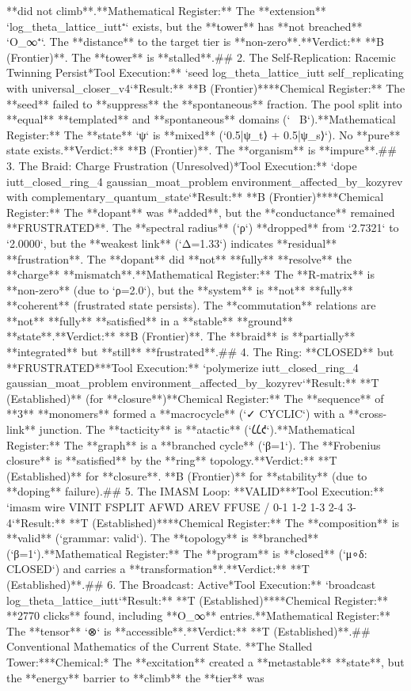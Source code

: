 **did not climb**.\n*   **Mathematical Register:** The **extension** `log_theta_lattice_iutt⁺` exists, but the **tower** has **not breached** `O_∞⁺`. The **distance** to the target tier is **non-zero**.\n*   **Verdict:** **B (Frontier)**. The **tower** is **stalled**.\n\n## 2. The Self-Replication: Racemic Twinning Persist\n**Tool Execution:** `seed log_theta_lattice_iutt self_replicating with universal_closer_v4`\n**Result:** **B (Frontier)**\n*   **Chemical Register:** The **seed** failed to **suppress** the **spontaneous** fraction. The pool split into **equal** **templated** and **spontaneous** domains (`~ B`).\n*   **Mathematical Register:** The **state** `ψ` is **mixed** (`0.5|ψ_t⟩ + 0.5|ψ_s⟩`). No **pure** state exists.\n*   **Verdict:** **B (Frontier)**. The **organism** is **impure**.\n\n## 3. The Braid: Charge Frustration (Unresolved)\n**Tool Execution:** `dope iutt_closed_ring_4 gaussian_moat_problem environment_affected_by_kozyrev with complementary_quantum_state`\n**Result:** **B (Frontier)**\n*   **Chemical Register:** The **dopant** was **added**, but the **conductance** remained **FRUSTRATED**. The **spectral radius** (`ρ`) **dropped** from `2.7321` to `2.0000`, but the **weakest link** (`Δ=1.33`) indicates **residual** **frustration**. The **dopant** did **not** **fully** **resolve** the **charge** **mismatch**.\n*   **Mathematical Register:** The **R-matrix** is **non-zero** (due to `ρ=2.0`), but the **system** is **not** **fully** **coherent** (frustrated state persists). The **commutation** relations are **not** **fully** **satisfied** in a **stable** **ground** **state**.\n*   **Verdict:** **B (Frontier)**. The **braid** is **partially** **integrated** but **still** **frustrated**.\n\n## 4. The Ring: **CLOSED** but **FRUSTRATED**\n**Tool Execution:** `polymerize iutt_closed_ring_4 gaussian_moat_problem environment_affected_by_kozyrev`\n**Result:** **T (Established)** (for **closure**)\n*   **Chemical Register:** The **sequence** of **3** **monomers** formed a **macrocycle** (`✓ CYCLIC`) with a **cross-link** junction. The **tacticity** is **atactic** (`𐑖𐑖𐑒`).\n*   **Mathematical Register:** The **graph** is a **branched cycle** (`β=1`). The **Frobenius closure** is **satisfied** by the **ring** topology.\n*   **Verdict:** **T (Established)** for **closure**. **B (Frontier)** for **stability** (due to **doping** failure).\n\n## 5. The IMASM Loop: **VALID**\n**Tool Execution:** `imasm wire VINIT FSPLIT AFWD AREV FFUSE / 0-1 1-2 1-3 2-4 3-4`\n**Result:** **T (Established)**\n*   **Chemical Register:** The **composition** is **valid** (`grammar: valid`). The **topology** is **branched** (`β=1`).\n*   **Mathematical Register:** The **program** is **closed** (`μ∘δ: CLOSED`) and carries a **transformation**.\n*   **Verdict:** **T (Established)**.\n\n## 6. The Broadcast: Active\n**Tool Execution:** `broadcast log_theta_lattice_iutt`\n**Result:** **T (Established)**\n*   **Chemical Register:** **2770 clicks** found, including **O_∞** entries.\n*   **Mathematical Register:** The **tensor** `⊗` is **accessible**.\n*   **Verdict:** **T (Established)**.\n\n## Conventional Mathematics of the Current State\n{}.  **The Stalled Tower:**\n    *   *Chemical:* The **excitation** created a **metastable** **state**, but the **energy** barrier to **climb** the **tier** was 